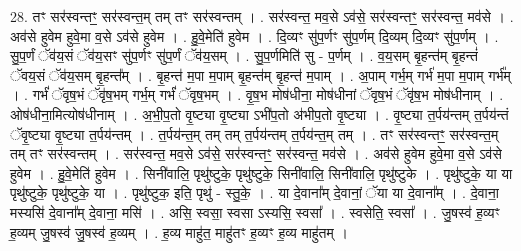 \documentclass[17pt]{extarticle}
\begin{document}
28. तꣳ सर॑स्वन्तꣳ॒॒ सर॑स्वन्त॒म् तम् तꣳ सर॑स्वन्तम् । . सर॑स्वन्त॒ मव॒से ऽव॑से॒ सर॑स्वन्तꣳ॒॒ सर॑स्वन्त॒ मव॑से । . अव॑से हुवेम हुवे॒मा व॒से ऽव॑से हुवेम । . हु॒वे॒मेति॑ हुवेम । . दि॒व्यꣳ सु॑प॒र्णꣳ सु॑प॒र्णम् दि॒व्यम् दि॒व्यꣳ सु॑प॒र्णम् । . सु॒प॒र्णं ॅव॑य॒सं ॅव॑य॒सꣳ सु॑प॒र्णꣳ सु॑प॒र्णं ॅव॑य॒सम् । . सु॒प॒र्णमिति॑ सु - प॒र्णम् । . व॒य॒सम् बृ॒हन्त॑म् बृ॒हन्तं॑ ॅवय॒सं ॅव॑य॒सम् बृ॒हन्त᳚म् । . बृ॒हन्त॑ म॒पा म॒पाम् बृ॒हन्त॑म् बृ॒हन्त॑ म॒पाम् । . अ॒पाम् गर्भ॒म् गर्भ॑ म॒पा म॒पाम् गर्भ᳚म् । . गर्भं॑ ॅवृष॒भं ॅवृ॑ष॒भम् गर्भ॒म् गर्भं॑ ॅवृष॒भम् । . वृ॒ष॒भ मोष॑धीना॒ मोष॑धीनां ॅवृष॒भं ॅवृ॑ष॒भ मोष॑धीनाम् । . ओष॑धीना॒मित्योष॑धीनाम् । . अ॒भी॒प॒तो वृ॒ष्ट्या वृ॒ष्ट्या ऽभी॑प॒तो अ॑भीप॒तो वृ॒ष्ट्या । . वृ॒ष्ट्या त॒र्पय॑न्तम् त॒र्पय॑न्तं ॅवृ॒ष्ट्या वृ॒ष्ट्या त॒र्पय॑न्तम् । . त॒र्पय॑न्त॒म् तम् तम् त॒र्पय॑न्तम् त॒र्पय॑न्त॒म् तम् । . तꣳ सर॑स्वन्तꣳ॒॒ सर॑स्वन्त॒म् तम् तꣳ सर॑स्वन्तम् । . सर॑स्वन्त॒ मव॒से ऽव॑से॒ सर॑स्वन्तꣳ॒॒ सर॑स्वन्त॒ मव॑से । . अव॑से हुवेम हुवे॒मा व॒से ऽव॑से हुवेम । . हु॒वे॒मेति॑ हुवेम । . सिनी॑वालि॒ पृथु॑ष्टुके॒ पृथु॑ष्टुके॒ सिनी॑वालि॒ सिनी॑वालि॒ पृथु॑ष्टुके । . पृथु॑ष्टुके॒ या या पृथु॑ष्टुके॒ पृथु॑ष्टुके॒ या । . पृथु॑ष्टुक॒ इति॒ पृथु॑ - स्तु॒के॒ । . या दे॒वाना᳚म् दे॒वानां॒ ॅया या दे॒वाना᳚म् । . दे॒वाना॒ मस्यसि॑ दे॒वाना᳚म् दे॒वाना॒ मसि॑ । . असि॒ स्वसा॒ स्वसा ऽस्यसि॒ स्वसा᳚ । . स्वसेति॒ स्वसा᳚ । . जु॒षस्व॑ ह॒व्यꣳ ह॒व्यम् जु॒षस्व॑ जु॒षस्व॑ ह॒व्यम् । . ह॒व्य माहु॑त॒ माहु॑तꣳ ह॒व्यꣳ ह॒व्य माहु॑तम् । \newline
\end{document}
